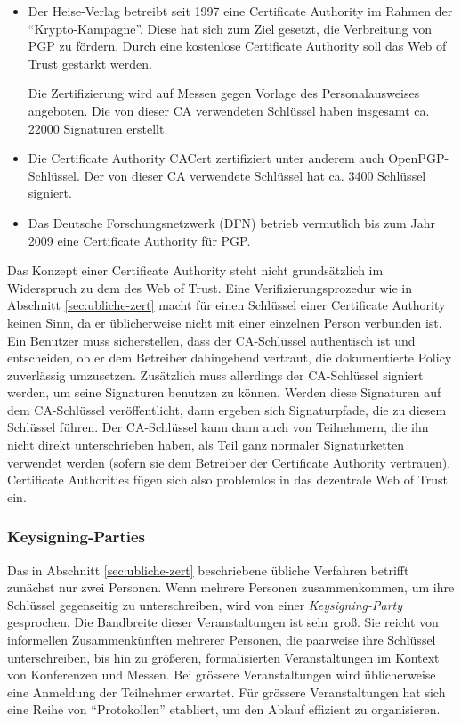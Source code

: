 \begin{itemize}
\item Der Heise-Verlag betreibt seit 1997 eine Certificate Authority
  im Rahmen der ``Krypto-Kampagne''. Diese hat sich zum Ziel gesetzt,
  die Verbreitung von PGP zu fördern. Durch eine kostenlose
  Certificate Authority soll das Web of Trust gestärkt werden.

  Die Zertifizierung wird auf Messen gegen Vorlage des
  Personalausweises angeboten. Die von dieser CA verwendeten
  Schlüssel haben insgesamt ca. 22000 Signaturen erstellt.
\item Die Certificate Authority CACert zertifiziert unter
  anderem auch OpenPGP-Schlüssel. Der von dieser CA verwendete
  Schlüssel hat ca. 3400 Schlüssel signiert.
\item Das Deutsche Forschungsnetzwerk (DFN) betrieb vermutlich bis zum
  Jahr 2009 eine Certificate Authority für PGP.
\end{itemize}

Das Konzept einer Certificate Authority steht nicht grundsätzlich im
Widerspruch zu dem des Web of Trust. Eine Verifizierungsprozedur wie
in Abschnitt \ref{sec:ubliche-zert} macht für einen Schlüssel
einer Certificate Authority keinen Sinn, da er üblicherweise nicht
mit einer einzelnen Person verbunden ist. Ein Benutzer muss
sicherstellen, dass der CA-Schlüssel authentisch ist und
entscheiden, ob er dem Betreiber dahingehend vertraut, die
dokumentierte Policy zuverlässig umzusetzen. Zusätzlich muss
allerdings der CA-Schlüssel signiert werden, um seine Signaturen
benutzen zu können. Werden diese Signaturen auf dem CA-Schlüssel
veröffentlicht, dann ergeben sich Signaturpfade, die zu diesem
Schlüssel führen. Der CA-Schlüssel kann dann auch von
Teilnehmern, die ihn nicht direkt unterschrieben haben, als Teil ganz
normaler Signaturketten verwendet werden (sofern sie dem Betreiber der
Certificate Authority vertrauen). Certificate Authorities fügen sich
also problemlos in das dezentrale Web of Trust ein.

\subsubsection{Keysigning-Parties}
\label{sec:keysigning-parties}

Das in Abschnitt \ref{sec:ubliche-zert} beschriebene übliche
Verfahren betrifft zunächst nur zwei Personen. Wenn mehrere Personen
zusammenkommen, um ihre Schlüssel gegenseitig zu unterschreiben,
wird von einer \emph{Keysigning-Party} gesprochen. Die Bandbreite
dieser Veranstaltungen ist sehr groß. Sie reicht von informellen
Zusammenkünften mehrerer Personen, die paarweise ihre Schlüssel
unterschreiben, bis hin zu größeren, formalisierten Veranstaltungen
im Kontext von Konferenzen und Messen. Bei grössere Veranstaltungen
wird üblicherweise eine Anmeldung der Teilnehmer erwartet. Für
grössere Veranstaltungen hat sich eine Reihe von ``Protokollen''
etabliert, um den Ablauf effizient zu organisieren\cite{Brennen2008}.

